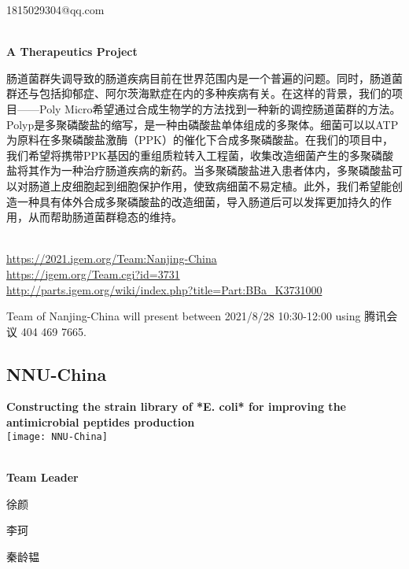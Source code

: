   1815029304@qq.com


\textbf{\\A Therapeutics Project\\}\begin{spacing}{1.5}

肠道菌群失调导致的肠道疾病目前在世界范围内是一个普遍的问题。同时，肠道菌群还与包括抑郁症、阿尔茨海默症在内的多种疾病有关。在这样的背景，我们的项目——Poly Micro希望通过合成生物学的方法找到一种新的调控肠道菌群的方法。Polyp是多聚磷酸盐的缩写，是一种由磷酸盐单体组成的多聚体。细菌可以以ATP为原料在多聚磷酸盐激酶（PPK）的催化下合成多聚磷酸盐。在我们的项目中，我们希望将携带PPK基因的重组质粒转入工程菌，收集改造细菌产生的多聚磷酸盐将其作为一种治疗肠道疾病的新药。当多聚磷酸盐进入患者体内，多聚磷酸盐可以对肠道上皮细胞起到细胞保护作用，使致病细菌不易定植。此外，我们希望能创造一种具有体外合成多聚磷酸盐的改造细菌，导入肠道后可以发挥更加持久的作用，从而帮助肠道菌群稳态的维持。\end{spacing}
\\

\url{https://2021.igem.org/Team:Nanjing-China }\\
\url{https://igem.org/Team.cgi?id=3731 }\\
\url{http://parts.igem.org/wiki/index.php?title=Part:BBa_K3731000 }\\


\vfill{}









Team of Nanjing-China will present between     2021/8/28 10:30-12:00    using 腾讯会议 404 469 7665.
\newpage


\subsection{\textcolor{Blu}{ NNU-China } }
\vspace{5mm}
\begin{center}
\large{
  \textbf{ Constructing the strain library of *E. coli* for improving the antimicrobial peptides production }\\
  \texttt{[image: NNU-China]}
}
\end{center}
\textbf{\\Team Leader}

  徐颜

  李珂

  秦龄韫



